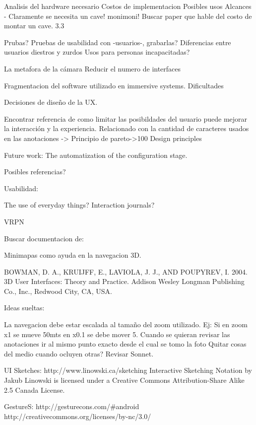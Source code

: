Analisis del hardware necesario
Costos de implementacion
Posibles usos
Alcances - Claramente se necesita un cave! monimoni!
Buscar paper que hable del costo de montar un cave. 3.3


Prubas?
Pruebas de usabilidad con -usuarios-, grabarlas? 
Diferencias entre usuarios diestros y zurdos
Usos para personas incapacitadas?

La metafora de la cámara
Reducir el numero de interfaces

Fragmentacion del software utilizado en immersive systems.
Dificultades

Decisiones de diseño de la UX.

Encontrar referencia de como limitar las posibildades del usuario puede mejorar la interacción y la experiencia. Relacionado con la cantidad de caracteres usados en las anotaciones -> Principio de pareto->100 Design principles


Future work:
	The automatization of the configuration stage.


Posibles referencias?

Usabilidad:

	The use of everyday things?
	Interaction journals?

VRPN




Buscar documentacion de:

Minimapas como ayuda en la navegacion 3D.

BOWMAN, D. A., KRUIJFF, E., LAVIOLA, J. J., AND POUPYREV, I. 2004. 3D User Interfaces: Theory and Practice. Addison Wesley Longman Publishing Co., Inc., Redwood City, CA, USA.

Ideas sueltas:

	La navegacion debe estar escalada al tamaño del zoom utilizado. Ej: Si en zoom x1 se mueve 50mts en x0.1 se debe mover 5.
	Cuando se quieran revisar las anotaciones ir al mismo punto exacto desde el cual se tomo la foto
	Quitar cosas del medio cuando ocluyen otras? Revisar Sonnet.
	
	
	
UI Sketches:
http://www.linowski.ca/sketching Interactive Sketching Notation by Jakub Linowski is licensed under a Creative Commons Attribution-Share Alike 2.5 Canada License.

GestureS: http://gesturecons.com/#android http://creativecommons.org/licenses/by-nc/3.0/